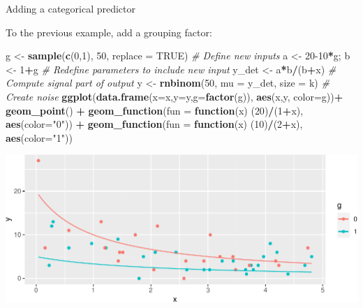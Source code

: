 \documentclass[
  ignorenonframetext,
]{beamer}
\newenvironment{Shaded}{\begin{snugshade}}{\end{snugshade}}
\newcommand{\CommentTok}[1]{\textcolor[rgb]{0.56,0.35,0.01}{\textit{#1}}}
\newcommand{\ControlFlowTok}[1]{\textcolor[rgb]{0.13,0.29,0.53}{\textbf{#1}}}
\newcommand{\DataTypeTok}[1]{\textcolor[rgb]{0.13,0.29,0.53}{#1}}
\newcommand{\DecValTok}[1]{\textcolor[rgb]{0.00,0.00,0.81}{#1}}
\newcommand{\KeywordTok}[1]{\textcolor[rgb]{0.13,0.29,0.53}{\textbf{#1}}}
\newcommand{\NormalTok}[1]{#1}
\newcommand{\OperatorTok}[1]{\textcolor[rgb]{0.81,0.36,0.00}{\textbf{#1}}}
\newcommand{\OtherTok}[1]{\textcolor[rgb]{0.56,0.35,0.01}{#1}}
\newcommand{\StringTok}[1]{\textcolor[rgb]{0.31,0.60,0.02}{#1}}
\begin{document}
\begin{frame}[fragile]{Adding a categorical predictor}
\protect\hypertarget{adding-a-categorical-predictor}{}

To the previous example, add a grouping factor:

\scriptsize

\begin{Shaded}
\begin{Highlighting}[]
\NormalTok{g <-}\StringTok{ }\KeywordTok{sample}\NormalTok{(}\KeywordTok{c}\NormalTok{(}\DecValTok{0}\NormalTok{,}\DecValTok{1}\NormalTok{), }\DecValTok{50}\NormalTok{, }\DataTypeTok{replace =} \OtherTok{TRUE}\NormalTok{) }\CommentTok{# Define new inputs}
\NormalTok{a <-}\StringTok{ }\DecValTok{20-10}\OperatorTok{*}\NormalTok{g; b <-}\StringTok{ }\DecValTok{1}\OperatorTok{+}\NormalTok{g }\CommentTok{# Redefine parameters to include new input}
\NormalTok{y_det <-}\StringTok{ }\NormalTok{a}\OperatorTok{*}\NormalTok{b}\OperatorTok{/}\NormalTok{(b}\OperatorTok{+}\NormalTok{x) }\CommentTok{# Compute signal part of output}
\NormalTok{y <-}\StringTok{ }\KeywordTok{rnbinom}\NormalTok{(}\DecValTok{50}\NormalTok{, }\DataTypeTok{mu =}\NormalTok{ y_det, }\DataTypeTok{size =}\NormalTok{ k) }\CommentTok{# Create noise}
\KeywordTok{ggplot}\NormalTok{(}\KeywordTok{data.frame}\NormalTok{(}\DataTypeTok{x=}\NormalTok{x,}\DataTypeTok{y=}\NormalTok{y,}\DataTypeTok{g=}\KeywordTok{factor}\NormalTok{(g)), }\KeywordTok{aes}\NormalTok{(x,y, }\DataTypeTok{color=}\NormalTok{g))}\OperatorTok{+}
\StringTok{  }\KeywordTok{geom_point}\NormalTok{() }\OperatorTok{+}\StringTok{ }
\StringTok{  }\KeywordTok{geom_function}\NormalTok{(}\DataTypeTok{fun =} \ControlFlowTok{function}\NormalTok{(x) (}\DecValTok{20}\NormalTok{)}\OperatorTok{/}\NormalTok{(}\DecValTok{1}\OperatorTok{+}\NormalTok{x), }\KeywordTok{aes}\NormalTok{(}\DataTypeTok{color=}\StringTok{"0"}\NormalTok{)) }\OperatorTok{+}
\StringTok{  }\KeywordTok{geom_function}\NormalTok{(}\DataTypeTok{fun =} \ControlFlowTok{function}\NormalTok{(x) (}\DecValTok{10}\NormalTok{)}\OperatorTok{/}\NormalTok{(}\DecValTok{2}\OperatorTok{+}\NormalTok{x), }\KeywordTok{aes}\NormalTok{(}\DataTypeTok{color=}\StringTok{"1"}\NormalTok{))}
\end{Highlighting}
\end{Shaded}

\includegraphics{simulation_files/figure-beamer/unnamed-chunk-11-1.pdf}

\end{frame}
\end{document}
